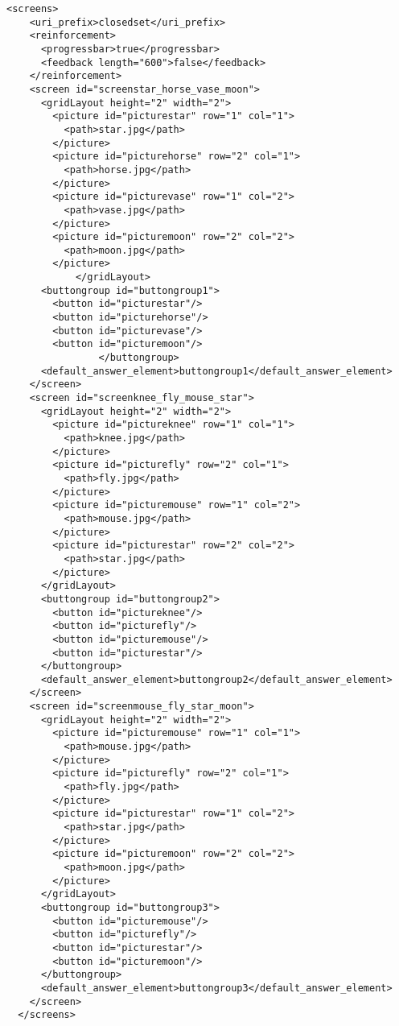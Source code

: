 \begin{lstlisting}
<screens>
    <uri_prefix>closedset</uri_prefix>
    <reinforcement>
      <progressbar>true</progressbar>
      <feedback length="600">false</feedback>
    </reinforcement>
    <screen id="screenstar_horse_vase_moon">
      <gridLayout height="2" width="2">
        <picture id="picturestar" row="1" col="1">
          <path>star.jpg</path>
        </picture>
        <picture id="picturehorse" row="2" col="1">
          <path>horse.jpg</path>
        </picture>
        <picture id="picturevase" row="1" col="2">
          <path>vase.jpg</path>
        </picture>
        <picture id="picturemoon" row="2" col="2">
          <path>moon.jpg</path>
        </picture>
            </gridLayout>
      <buttongroup id="buttongroup1">
        <button id="picturestar"/>
        <button id="picturehorse"/>
        <button id="picturevase"/>
        <button id="picturemoon"/>
                </buttongroup>
      <default_answer_element>buttongroup1</default_answer_element>
    </screen>
    <screen id="screenknee_fly_mouse_star">
      <gridLayout height="2" width="2">
        <picture id="pictureknee" row="1" col="1">
          <path>knee.jpg</path>
        </picture>
        <picture id="picturefly" row="2" col="1">
          <path>fly.jpg</path>
        </picture>
        <picture id="picturemouse" row="1" col="2">
          <path>mouse.jpg</path>
        </picture>
        <picture id="picturestar" row="2" col="2">
          <path>star.jpg</path>
        </picture>
      </gridLayout>
      <buttongroup id="buttongroup2">
        <button id="pictureknee"/>
        <button id="picturefly"/>
        <button id="picturemouse"/>
        <button id="picturestar"/>
      </buttongroup>
      <default_answer_element>buttongroup2</default_answer_element>
    </screen>
    <screen id="screenmouse_fly_star_moon">
      <gridLayout height="2" width="2">
        <picture id="picturemouse" row="1" col="1">
          <path>mouse.jpg</path>
        </picture>
        <picture id="picturefly" row="2" col="1">
          <path>fly.jpg</path>
        </picture>
        <picture id="picturestar" row="1" col="2">
          <path>star.jpg</path>
        </picture>
        <picture id="picturemoon" row="2" col="2">
          <path>moon.jpg</path>
        </picture>
      </gridLayout>
      <buttongroup id="buttongroup3">
        <button id="picturemouse"/>
        <button id="picturefly"/>
        <button id="picturestar"/>
        <button id="picturemoon"/>
      </buttongroup>
      <default_answer_element>buttongroup3</default_answer_element>
    </screen>
  </screens>
\end{lstlisting}

